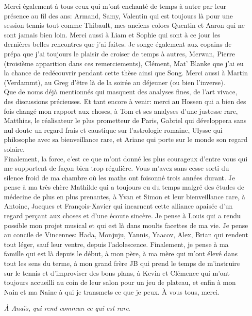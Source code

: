 Merci également à tous ceux qui m'ont enchanté de temps à autre par leur présence au fil des ans: Armand, Samy, Valentin qui est toujours là pour une session tennis tout comme Thibault, mes anciens colocs Quentin et Aaron qui ne sont jamais bien loin. Merci aussi à Liam et Sophie qui sont à ce jour les dernières belles rencontres que j'ai faites.
Je songe également aux copains de prépa que j'ai toujours le plaisir de croiser de temps à autres, Merwan, Pierre (troisième apparition dans ces remerciements), Clément, Mat' Blanke que j'ai eu la chance de redécouvrir pendant cette thèse ainsi que Song. Merci aussi à Martin (Verdammt), au Greg d'être là de la soirée au déjeuner (ou bien l'inverse).\\  
Que de noms déjà mentionnés qui masquent des analyses fines, de l'art vivace, des discussions précieuses. Et tant encore à venir: merci au Hossen qui a bien des fois changé mon rapport aux choses, à Tom et ses analyses d'une justesse rare, Matthias, le réalisateur le plus prometteur de Paris, Gabriel qui développera sans nul doute un regard frais et caustique sur l'astrologie romaine, Ulysse qui philosophe avec sa bienveillance rare, et Ariane qui porte sur le monde son regard solaire.\\
Finalement, la force, c'est ce que m'ont donné les plus courageux d'entre vous qui me supportent de façon bien trop régulière. Vous m'avez sans cesse sorti du silence froid de ma chambre où les maths ont foisonné trois années durant. Je pense à ma très chère Mathilde qui a toujours eu du temps malgré des études de médecine de plus en plus prenantes, à Yvan et Simon et leur bienveillance rare, à Antoine, Jacques et François-Xavier qui incarnent cette alliance apaisée d'un regard perçant aux choses et d'une écoute sincère. Je pense à Louis qui a rendu possible mon projet musical et qui est là dans moults facettes de ma vie. Je pense au concile de Vincennes: Hada, Monjuju, Yannis, Yaacov, Alex, Brian qui rendent tout léger, sauf leur ventre, depuis l'adolescence. Finalement, je pense à ma famille qui est là depuis le début, à mon père, à ma mère qui m'ont élevé dans tout les sens du terme, à mon grand frère JB qui prend le temps de m'instruire sur le tennis et d'improviser des bons plans, à Kevin et Clémence qui m'ont toujours accueilli au coin de leur salon pour un jeu de plateau, et enfin à mon Nain et ma Naine à qui je transmets ce que je peux. À vous tous, merci.

\newpage
\textit{À Anaïs, qui rend commun ce qui est rare.}